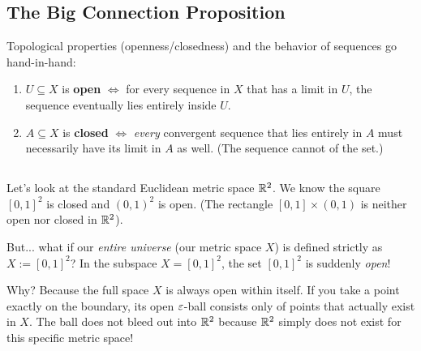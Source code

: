 \subsection*{The Big Connection Proposition}
Topological properties (openness/closedness) and the behavior of sequences go hand-in-hand:
\begin{enumerate}
    \item $U \subseteq X$ is \textbf{open} $\iff$ for every sequence in $X$ that has a limit in $U$, the sequence eventually lies entirely inside $U$.
    \item $A \subseteq X$ is \textbf{closed} $\iff$ \emph{every} convergent sequence that lies entirely in $A$ must necessarily have its limit in $A$ as well. \textcolor{eGray}{(The sequence cannot  of the set.)}
\end{enumerate}

\subsection*{}
Let's look at the standard Euclidean metric space $\mathbb{R}^2$. We know the square $[0,1]^2$ is closed and $(0,1)^2$ is open. (The rectangle $[0,1] \times (0,1)$ is neither open nor closed in $\mathbb{R}^2$).

\textcolor{eDarkRed}{But...} what if our \textit{entire universe} (our metric space $X$) is defined strictly as $X := [0,1]^2$? 
In the subspace $X = [0,1]^2$, the set $[0,1]^2$ is suddenly \emph{open}! 

\textcolor{eDarkCyan}{Why?} Because the full space $X$ is always open within itself. If you take a point exactly on the boundary, its open $\varepsilon$-ball consists only of points \textcolor{eSaddleBrown}{that actually exist in $X$}. The ball does not bleed out into $\mathbb{R}^2$ because $\mathbb{R}^2$ simply does not exist for this specific metric space!

\begin{center}
\end{center}


